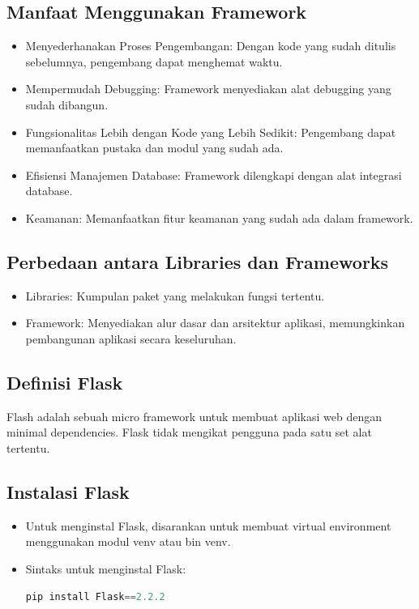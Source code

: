 \documentclass{article}
\begin{document}
\subsection{Manfaat Menggunakan Framework}
\begin{itemize}
    \item Menyederhanakan Proses Pengembangan: Dengan kode yang sudah ditulis sebelumnya, pengembang dapat menghemat waktu.
    \item Mempermudah Debugging: Framework menyediakan alat debugging yang sudah dibangun.
    \item Fungsionalitas Lebih dengan Kode yang Lebih Sedikit: Pengembang dapat memanfaatkan pustaka dan modul yang sudah ada.
    \item Efisiensi Manajemen Database: Framework dilengkapi dengan alat integrasi database.
    \item Keamanan: Memanfaatkan fitur keamanan yang sudah ada dalam framework.
\end{itemize}

\subsection{Perbedaan antara Libraries dan Frameworks}
\begin{itemize}
    \item Libraries: Kumpulan paket yang melakukan fungsi tertentu.
    \item Framework: Menyediakan alur dasar dan arsitektur aplikasi, memungkinkan pembangunan aplikasi secara keseluruhan.
\end{itemize}

\subsection{Definisi Flask}
Flash adalah sebuah micro framework untuk membuat aplikasi web dengan minimal dependencies. Flask tidak mengikat pengguna pada satu set alat tertentu.

\subsection{Instalasi Flask}
\begin{itemize}
    \item Untuk menginstal Flask, disarankan untuk membuat virtual environment menggunakan modul venv atau bin venv.
    \item Sintaks untuk menginstal Flask:
          \begin{lstlisting}[language=Python, caption={}, captionpos=b]
    pip install Flask==2.2.2
\end{lstlisting}
\end{itemize}
\end{document}
